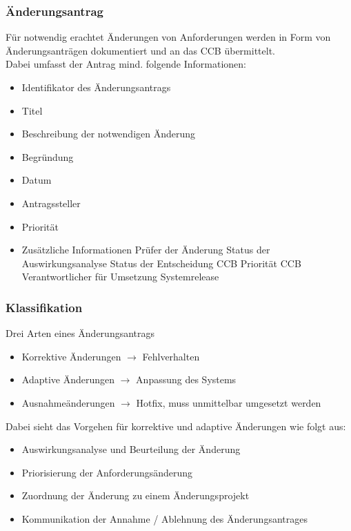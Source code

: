 \documentclass{report}
\theoremstyle{definition}
\theoremstyle{example}
\begin{document}
\subsubsection{Änderungsantrag}
Für notwendig erachtet Änderungen von Anforderungen werden in Form von Änderungsanträgen dokumentiert und an das CCB übermittelt.\\
Dabei umfasst der Antrag mind. folgende Informationen:
\begin{itemize}
   \item Identifikator des Änderungsantrags
   \item Titel 
   \item Beschreibung der notwendigen Änderung
   \item Begründung
   \item Datum
   \item Antragssteller
   \item Priorität
   \item Zusätzliche Informationen
   \subitem Prüfer der Änderung
   \subitem Status der Auswirkungsanalyse
   \subitem Status der Entscheidung CCB
   \subitem Priorität CCB
   \subitem Verantwortlicher für Umsetzung
   \subitem Systemrelease
\end{itemize}

\subsubsection{Klassifikation}
Drei Arten eines Änderungsantrags
\begin{itemize}
   \item Korrektive Änderungen $\rightarrow$ Fehlverhalten
   \item Adaptive Änderungen $\rightarrow$ Anpassung des Systems
   \item Ausnahmeänderungen $\rightarrow$ Hotfix, muss unmittelbar umgesetzt werden
\end{itemize}

Dabei sieht das Vorgehen für korrektive und adaptive Änderungen wie folgt aus:
\begin{itemize}
   \item Auswirkungsanalyse und Beurteilung der Änderung
   \item Priorisierung der Anforderungsänderung
   \item Zuordnung der Änderung zu einem Änderungsprojekt
   \item Kommunikation der Annahme / Ablehnung des Änderungsantrages
\end{itemize}
\end{document}
